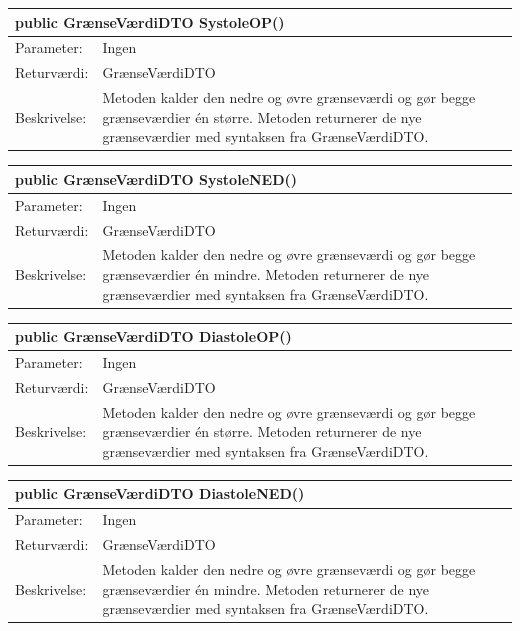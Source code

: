 \begin{table}[H]
\label{tab:tabel2}
\begin{tabular}{| l | p{13cm} |}
   \hline
   \multicolumn{2}{|l|}{public GrænseVærdiDTO SystoleOP()} \\ \hline
   Parameter: & Ingen \\ \hline
   Returværdi: & GrænseVærdiDTO\\ \hline
   Beskrivelse: & Metoden kalder den nedre og øvre grænseværdi og gør begge grænseværdier én større. Metoden returnerer de nye grænseværdier med syntaksen fra GrænseVærdiDTO.\\ \hline
\end{tabular}
\end{table}
\begin{table}[H]
\label{tab:tabel2}
\begin{tabular}{| l | p{13cm} |}
   \hline
   \multicolumn{2}{|l|}{public GrænseVærdiDTO SystoleNED()} \\ \hline
   Parameter: & Ingen \\ \hline
   Returværdi: & GrænseVærdiDTO\\ \hline
   Beskrivelse: & Metoden kalder den nedre og øvre grænseværdi og gør begge grænseværdier én mindre. Metoden returnerer de nye grænseværdier med syntaksen fra GrænseVærdiDTO.\\ \hline
\end{tabular}
\end{table}
\begin{table}[H]
\label{tab:tabel2}
\begin{tabular}{| l | p{13cm} |}
   \hline
   \multicolumn{2}{|l|}{public GrænseVærdiDTO DiastoleOP()} \\ \hline
   Parameter: & Ingen \\ \hline
   Returværdi: & GrænseVærdiDTO\\ \hline
   Beskrivelse: & Metoden kalder den nedre og øvre grænseværdi og gør begge grænseværdier én større. Metoden returnerer de nye grænseværdier med syntaksen fra GrænseVærdiDTO.\\ \hline
\end{tabular}
\end{table}
\begin{table}[H]
\label{tab:tabel2}
\begin{tabular}{| l | p{13cm} |}
   \hline
   \multicolumn{2}{|l|}{public GrænseVærdiDTO DiastoleNED()} \\ \hline
   Parameter: & Ingen \\ \hline
   Returværdi: & GrænseVærdiDTO\\ \hline
   Beskrivelse: & Metoden kalder den nedre og øvre grænseværdi og gør begge grænseværdier én mindre. Metoden returnerer de nye grænseværdier med syntaksen fra GrænseVærdiDTO.\\ \hline
\end{tabular}
\end{table}
